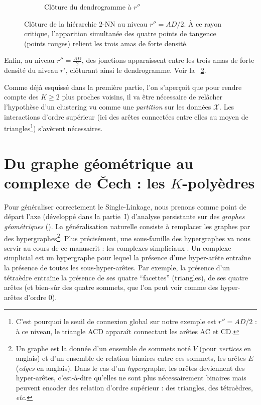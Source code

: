 \begin{figure}[htbp]
\begin{subfigure}[b]{0.51\textwidth}
\begin{tikzpicture}[scale=0.65]
        \end{tikzpicture}
        \caption{Clôture du dendrogramme à $r''$}
        \label{fig:fusion_rsecond}
    \end{subfigure}
    
    \caption{Clôture de la hiérarchie $2$-NN au niveau $r'' = AD/2$. À ce rayon critique, l'apparition simultanée des quatre points de tangence (points rouges) relient les trois amas de forte densité.}
    \label{fig:complexe_rsecond}
\end{figure}

Enfin, au niveau $r''= \frac{AD}{2}$, des jonctions apparaissent entre les trois amas de forte densité du niveau $r'$, clôturant ainsi le dendrogramme. Voir la \Fig~\ref{fig:complexe_rsecond}.

Comme déjà esquissé dans la première partie, l'on s'aperçoit que pour rendre compte des $K \ge 2$ plus proches voisins, il va être nécessaire de relâcher l'hypothèse d'un clustering vu comme une \emph{partition} sur les données $\mathcal X$.
Les interactions d'ordre supérieur (ici des arêtes connectées entre elles au moyen de triangles\footnote{C'est pourquoi le seuil de connexion global sur notre exemple est  $r'' = AD/2$ : à ce niveau, le triangle ACD apparaît connectant les arêtes AC et CD.}) s'avèrent nécessaires.


\section{Du graphe géométrique au complexe de \v Cech : les $K$-polyèdres}
\label{sec:KPolyedres}

Pour généraliser correctement le Single-Linkage, nous prenons comme point de départ l'axe (développé dans la partie~I) d'analyse persistante sur des \emph{graphes géométriques} ().
La généralisation naturelle consiste à remplacer les graphes par des hypergraphes\footnote{Un graphe est la donnée d'un ensemble de sommets noté $V$ (pour \emph{vertices} en anglais) et d'un ensemble de relation binaires entre ces sommets, les arêtes $E$ (\emph{edges} en anglais). Dans le cas d'un \emph{hyper}graphe, les arêtes deviennent des hyper-arêtes, c'est-à-dire qu'elles ne sont plus nécessairement binaires mais peuvent encoder des relation d'ordre supérieur : des triangles, des tétraèdres, \emph{etc}.}.
Plus précisément, une sous-famille des hypergraphes va nous servir au cours de ce manuscrit : les complexes simpliciaux \cite{Munkres}. Un complexe simplicial est un hypergraphe pour lequel la présence d'une hyper-arête entraîne la présence de toutes les sous-hyper-arêtes. Par exemple, la présence d'un tétraèdre entraîne la présence de ses quatre ``facettes'' (triangles), de ses quatre arêtes (et bien-sûr des quatre sommets, que l'on peut voir comme des hyper-arêtes d'ordre $0$).

